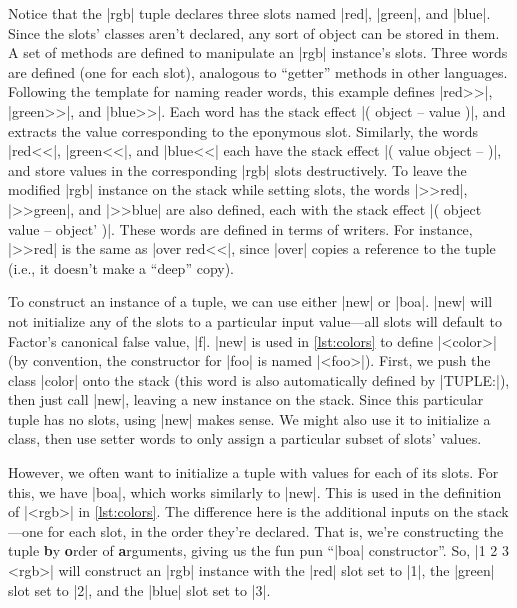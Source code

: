 Notice that the \factor|rgb| tuple declares three slots named \factor|red|,
\factor|green|, and \factor|blue|.  Since the slots' classes aren't declared,
any sort of object can be stored in them.  A set of methods are defined to
manipulate an \factor|rgb| instance's slots.  Three  words are
defined (one for each slot), analogous to ``getter'' methods in other
languages.  Following the template for naming reader words, this example
defines \factor|red>>|, \factor|green>>|, and \factor|blue>>|.  Each word has
the stack effect
%
\factor|( object -- value )|,
%
and extracts the value corresponding to the eponymous slot.  Similarly, the
 words \factor|red<<|, \factor|green<<|, and \factor|blue<<| each
have the stack effect
%
\factor|( value object -- )|,
%
and store values in the corresponding \factor|rgb| slots destructively.  To
leave the modified \factor|rgb| instance on the stack while setting slots, the
 words \factor|>>red|, \factor|>>green|, and \factor|>>blue| are
also defined, each with the stack effect
%
\factor|( object value -- object' )|.
%
These words are defined in terms of writers.  For instance, \factor|>>red| is
the same as \factor|over red<<|, since \factor|over| copies a reference to the
tuple (i.e., it doesn't make a ``deep'' copy).

To construct an instance of a tuple, we can use either \factor|new| or
\factor|boa|.  \factor|new| will not initialize any of the slots to a
particular input value---all slots will default to Factor's canonical false
value, \factor|f|.  \factor|new| is used in \vref{lst:colors} to define
\factor|<color>| (by convention, the constructor for \factor|foo| is named
\factor|<foo>|).  First, we push the class \factor|color| onto the stack (this
word is also automatically defined by \factor|TUPLE:|), then just call
\factor|new|, leaving a new instance on the stack.  Since this particular tuple
has no slots, using \factor|new| makes sense.  We might also use it to
initialize a class, then use setter words to only assign a particular subset of
slots' values.

However, we often want to initialize a tuple with values for each of its slots.
For this, we have \factor|boa|, which works similarly to \factor|new|.  This is
used in the definition of \factor|<rgb>| in \vref{lst:colors}.  The difference
here is the additional inputs on the stack---one for each slot, in the order
they're declared.  That is, we're constructing the tuple \textbf{b}y
\textbf{o}rder of \textbf{a}rguments, giving us the fun pun ``\factor|boa|
constructor''.  So, \factor|1 2 3 <rgb>| will construct an \factor|rgb|
instance with the \factor|red| slot set to \factor|1|, the \factor|green| slot
set to \factor|2|, and the \factor|blue| slot set to \factor|3|.

